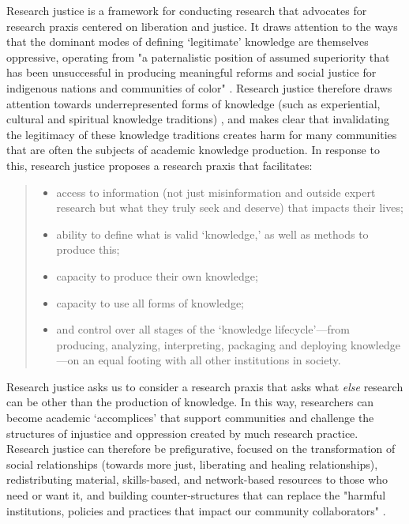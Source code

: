 Research justice is a framework for conducting research that advocates for research praxis centered on liberation and justice. It draws attention to the ways that the dominant modes of defining `legitimate' knowledge are themselves oppressive, operating from "a paternalistic position of assumed superiority that has been unsuccessful in producing meaningful reforms and social justice for indigenous nations and communities of color" \citep{jolivette_research_2015}. Research justice therefore draws attention towards underrepresented forms of knowledge (such as experiential, cultural and spiritual knowledge traditions) \cite[p. 4]{asad_prefigurative_2019}, and makes clear that invalidating the legitimacy of these knowledge traditions creates harm for many communities that are often the subjects of academic knowledge production. In response to this, research justice proposes a research praxis that facilitates:
\begin{quote}
\begin{itemize}
\item access to information (not just misinformation and outside expert research but what they truly seek and deserve) that impacts their lives; 
\item ability to define what is valid ‘knowledge,' as well as methods to produce this; 
\item capacity to produce their own knowledge; 
\item capacity to use all forms of knowledge; 
\item and control over all stages of the `knowledge lifecycle'—from producing, analyzing, interpreting, packaging and deploying knowledge—on an equal footing with all other institutions in society. \citep{jolivette_research_2015}
\end{itemize}
\end{quote}
Research justice asks us to consider a research praxis that asks what \textit{else} research can be other than the production of knowledge. In this way, researchers can become academic `accomplices' \citep{asad_academic_2019} that support communities and challenge the structures of injustice and oppression created by much research practice.  Research justice can therefore be prefigurative, focused on the transformation of social relationships (towards more just, liberating and healing relationships), redistributing material, skills-based, and network-based resources to those who need or want it, and building counter-structures that can replace the "harmful institutions, policies and practices that impact our community collaborators" \citep[p. 13]{asad_prefigurative_2019}.

